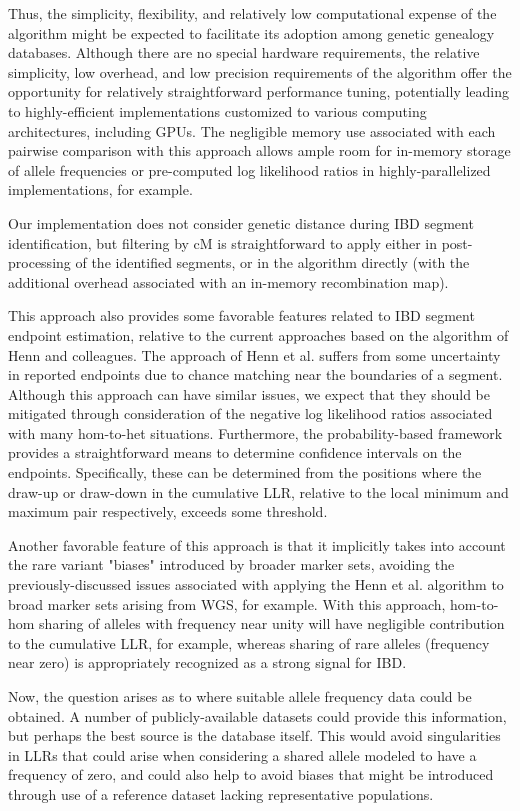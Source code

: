 \documentclass{article}
\begin{document}
Thus, the simplicity, flexibility, and relatively low computational expense of the algorithm might be expected to facilitate its adoption among genetic genealogy databases. Although there are no special hardware requirements, the relative simplicity, low overhead, and low precision requirements of the algorithm offer the opportunity for relatively straightforward performance tuning, potentially leading to highly-efficient implementations customized to various computing architectures, including GPUs. The negligible memory use associated with each pairwise comparison with this approach allows ample room for in-memory storage of allele frequencies or pre-computed log likelihood ratios in highly-parallelized implementations, for example.

Our implementation does not consider genetic distance during IBD segment identification, but filtering by cM is straightforward to apply either in post-processing of the identified segments, or in the algorithm directly (with the additional overhead associated with an in-memory recombination map).

This approach also provides some favorable features related to IBD segment endpoint estimation, relative to the current approaches based on the algorithm of Henn and colleagues. The approach of Henn et al. suffers from some uncertainty in reported endpoints due to chance matching near the boundaries of a segment. Although this approach can have similar issues, we expect that they should be mitigated through consideration of the negative log likelihood ratios associated with many hom-to-het situations. Furthermore, the probability-based framework provides a straightforward means to determine confidence intervals on the endpoints. Specifically, these can be determined from the positions where the draw-up or draw-down in the cumulative LLR, relative to the local minimum and maximum pair respectively, exceeds some threshold.

Another favorable feature of this approach is that it implicitly takes into account the rare variant "biases" introduced by broader marker sets, avoiding the previously-discussed issues associated with applying the Henn et al. algorithm to broad marker sets arising from WGS, for example. With this approach, hom-to-hom sharing of alleles with frequency near unity will have negligible contribution to the cumulative LLR, for example, whereas sharing of rare alleles (frequency near zero) is appropriately recognized as a strong signal for IBD.

Now, the question arises as to where suitable allele frequency data could be obtained. A number of publicly-available datasets could provide this information, but perhaps the best source is the database itself. This would avoid singularities in LLRs that could arise when considering a shared allele modeled to have a frequency of zero, and could also help to avoid biases that might be introduced through use of a reference dataset lacking representative populations.
\end{document}
